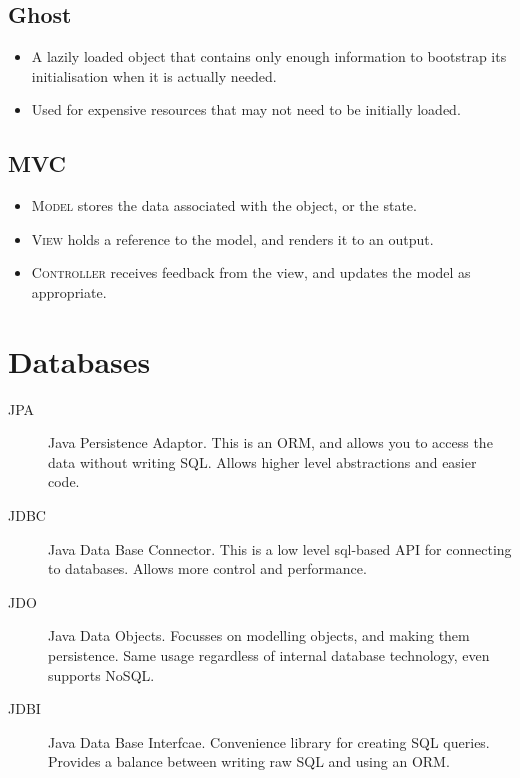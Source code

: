 \documentclass[landscape]{cheat}
\begin{document}
\begin{multicols*}{3}
\subsection{Ghost}
\begin{itemize}
    \item A lazily loaded object that contains only enough information to bootstrap its initialisation when it is actually needed.
    \item Used for expensive resources that may not need to be initially loaded.
\end{itemize}

\subsection{MVC}
\begin{itemize}
    \item \textsc{Model} stores the data associated with the object, or the state.
    \item \textsc{View} holds a reference to the model, and renders it to an output.
    \item \textsc{Controller} receives feedback from the view, and updates the model as appropriate.
\end{itemize}

\section{Databases}

\begin{description}
    \item[JPA] Java Persistence Adaptor.
        This is an ORM, and allows you to access the data without writing SQL.
        Allows higher level abstractions and easier code.
    \item[JDBC] Java Data Base Connector.
        This is a low level sql-based API for connecting to databases.
        Allows more control and performance.
    \item[JDO] Java Data Objects.
        Focusses on modelling objects, and making them persistence.
        Same usage regardless of internal database technology, even supports NoSQL.
    \item[JDBI] Java Data Base Interfcae.
        Convenience library for creating SQL queries.
        Provides a balance between writing raw SQL and using an ORM.
\end{description}

\end{multicols*}
\end{document}
